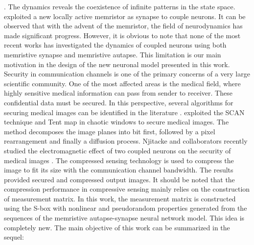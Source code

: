 \documentclass[journal]{IEEEtran/IEEEtran}
\begin{document}
\cite{njitacke2022hamilton}. The dynamics reveals the coexistence of infinite patterns in the state space. \cite{tan2020simple} exploited a new locally active memristor as synapse to couple neurons. It can be observed that with the advent of the memristor, the field of neurodynamics has made significant progress. However, it is obvious to note that none of the most recent works has investigated the dynamics of coupled neurons using both memristive synapse and memristive autapse. This limitation is our main motivation in the design of the new neuronal model presented in this work. \\
Security in communication channels is one of the primary concerns of a very large scientific community. One of the most affected areas is the medical field, where highly sensitive medical information can pass from sender to receiver. These confidential data must be secured. In this perspective, several algorithms for securing medical images can be identified in the literature \cite{parameshachari2022medical,njitacke2021complex}. \cite{parameshachari2022medical} exploited the SCAN technique and Tent map in chaotic windows to secure medical images. The method decomposes the image planes into bit first, followed by a pixel rearrangement and finally a diffusion process. Njitacke and collaborators recently studied the electromagnetic effect of two coupled neurons on the security of medical images \cite{njitacke2021complex}. The compressed sensing technology is used to compress the image to fit its size with the communication channel bandwidth. The results provided secured and compressed output images. It should be noted that the compression performance in compressive sensing mainly relies on the construction of measurement matrix. In this work, the measurement matrix is constructed using the S-box with nonlinear and pseudorandom properties generated from the sequences of the memristive autapse-synapse neural network model. This idea is completely new. The main objective of this work can be summarized in the sequel:
\end{document}
